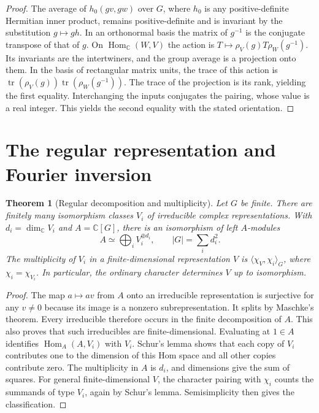 \documentclass[11pt,oneside,openany]{book}
\newtheorem{theorem}{Theorem}[chapter]
\theoremstyle{definition}
\theoremstyle{remark}
\begin{document}
\begin{proof}
The average of \(h_0(gv,gw)\) over \(G\), where \(h_0\) is any
positive-definite Hermitian inner product, remains positive-definite
and is invariant by the substitution \(g\mapsto gh\). In an orthonormal
basis the matrix of \(g^{-1}\) is the conjugate transpose of that
of \(g\). On \(\operatorname{Hom}_{\mathbb C}(W,V)\) the action is
\(T\mapsto \rho_V(g)T\rho_W(g^{-1})\). Its invariants are the
intertwiners, and the group average is a projection onto them.
In the basis of rectangular matrix units, the trace of this action is
\(\operatorname{tr}(\rho_V(g))\operatorname{tr}(\rho_W(g^{-1}))\).
The trace of the projection is its rank, yielding the first equality.
Interchanging the inputs conjugates the pairing, whose value is a real
integer. This yields the second equality with the stated orientation.
\end{proof}

\section{The regular representation and Fourier inversion}

\begin{theorem}[Regular decomposition and multiplicity]
\label{p103:ALG-07-C02-R03}
Let \(G\) be finite. There are finitely many isomorphism classes
\(V_i\) of irreducible complex representations. With
\(d_i=\dim_{\mathbb C}V_i\) and \(A=\mathbb C[G]\), there is an
isomorphism of left \(A\)-modules
\[
 A\simeq \bigoplus_i V_i^{\oplus d_i},
 \qquad |G|=\sum_i d_i^2.
\]
The multiplicity of \(V_i\) in a finite-dimensional representation
\(V\) is \(\langle\chi_V,\chi_i\rangle_G\), where
\(\chi_i=\chi_{V_i}\). In particular, the ordinary character determines
\(V\) up to isomorphism.
\end{theorem}

\begin{proof}
The map \(a\mapsto av\) from \(A\) onto an irreducible representation
is surjective for any \(v\ne0\) because its image is a nonzero
subrepresentation. It splits by Maschke's theorem. Every irreducible
therefore occurs in the finite decomposition of \(A\). This also
proves that such irreducibles are finite-dimensional. Evaluating at
\(1\in A\) identifies \(\operatorname{Hom}_A(A,V_i)\) with \(V_i\).
Schur's lemma shows that each copy of \(V_i\) contributes one to the
dimension of this Hom space and all other copies contribute zero.
The multiplicity in \(A\) is \(d_i\), and dimensions give the
sum of squares. For general finite-dimensional \(V\), the character
pairing with \(\chi_i\) counts the summands of type \(V_i\), again by
Schur's lemma. Semisimplicity then gives the classification.
\end{proof}
\end{document}

